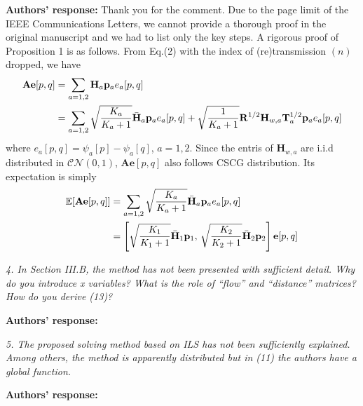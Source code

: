\documentclass[onecolumn, 11pt, draftclsnofoot]{IEEEtran}
\begin{document}
\noindent \textbf{Authors' response:}
Thank you for the comment. Due to the page limit of the IEEE Communications
Letters, we cannot provide a thorough proof in the original manuscript and we
had to list only the key steps. A rigorous proof of Proposition 1 is as follows.
From Eq.(2) with the index of (re)transmission $(n)$ dropped, we have
\begin{align}
  \mathbf{A}\mathbf{e}[p,q] &= \sum_{a=1,2}\mathbf{H}_a\mathbf{p}_ae_a[p,q]
  \notag\\
  &= \sum_{a=1,2}  \sqrt{\frac{K_a}{K_a+1}}
  \bar{\mathbf{H}}_{a}\mathbf{p}_a e_a[p,q] + \sqrt{\frac{1}{K_a+1}}
  \mathbf{R}^{1/2} \mathbf{H}_{w,a} \mathbf{T}_a^{1/2} \mathbf{p}_a
  e_a[p,q]
\end{align}
where $e_a[p,q] = \psi_a[p]-\psi_a[q]$, $a=1,2$. Since the entris of
$\mathbf{H}_{w,a}$ are i.i.d distributed in $\mathcal{CN}(0,1)$,
$\mathbf{A}\mathbf{e}[p,q]$ also follows CSCG distribution. Its expectation is
simply
\begin{align}
  \mathbb{E}[\mathbf{A}\mathbf{e}[p,q]] &= \sum_{a=1,2}  \sqrt{\frac{K_a}{K_a+1}}
  \bar{\mathbf{H}}_{a}\mathbf{p}_a e_a[p,q] \notag \\
  & =  \left[\sqrt{\frac{K_1}{K_1+1}}\bar{\mathbf{H}}_1\mathbf{p}_1
  ,\, \sqrt{\frac{K_2}{K_2+1}}\bar{\mathbf{H}}_2\mathbf{p}_2
  \right]\mathbf{e}[p,q]
\end{align}

\vspace{0.5cm}

\noindent
\emph{4. In Section III.B, the method has not been presented with sufficient
detail. Why do you introduce x variables? What is the role of “flow” and
“distance” matrices? How do you derive (13)?}

\noindent \textbf{Authors' response:}

\vspace{0.5cm}

\noindent
\emph{5. The proposed solving method based on ILS has not been sufficiently
explained. Among others, the method is apparently distributed but in (11) the
authors have a global function.}

\noindent \textbf{Authors' response:}

\vspace{0.5cm}

\end{document}
